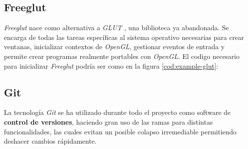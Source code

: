 \FloatBarrier
\subsection{Freeglut} \label{sub:support-freeglut}
\textit{Freeglut} \cite{webFreeglut} nace como alternativa a \textit{GLUT} \cite{specsGLUT}, una biblioteca ya abandonada. Se encarga de todas las tareas específicas al sistema operativo necesarias para crear ventanas, inicializar contextos de \textit{OpenGL}, gestionar eventos de entrada y permite crear programas realmente portables con \textit{OpenGL}. El codigo necesario para inicializar \textit{Freeglut} podría ser como en la figura \ref{cod:example-glut}:



\FloatBarrier

\subsection{Git} \label{sub:support-git}

La tecnología \textit{Git} se ha utilizado durante todo el proyecto como software de \textbf{control de versiones}, haciendo gran uso de las ramas para distintas funcionalidades, las cuales evitan un posible colapso irremediable permitiendo deshacer cambios rápidamente.
